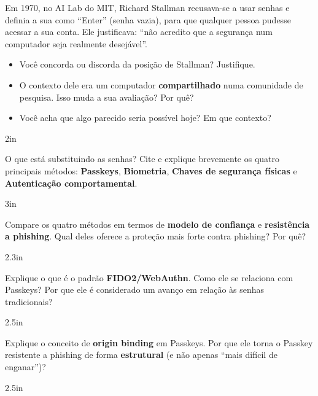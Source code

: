 \documentclass[12pt]{exam}
\begin{document}
	\noindent
\begin{questions}


\question Em 1970, no AI Lab do MIT, Richard Stallman recusava-se a usar senhas 
e definia a sua como ``Enter'' (senha vazia), para que qualquer pessoa pudesse 
acessar a sua conta. Ele justificava: ``não acredito que a segurança num 
computador seja realmente desejável''.

\begin{itemize}
\item Você concorda ou discorda da posição de Stallman? Justifique.
\item O contexto dele era um computador \textbf{compartilhado} numa comunidade 
de pesquisa. Isso muda a sua avaliação? Por quê?
\item Você acha que algo parecido seria possível hoje? Em que contexto?
\end{itemize}
\begin{solutionbox}{2in}
\end{solutionbox}


\question O que está substituindo as senhas? Cite e explique brevemente 
os quatro principais métodos: \textbf{Passkeys}, \textbf{Biometria}, 
\textbf{Chaves de segurança físicas} e \textbf{Autenticação comportamental}.
\begin{solutionbox}{3in}
\end{solutionbox}

\question Compare os quatro métodos em termos de \textbf{modelo de confiança} 
e \textbf{resistência a phishing}. Qual deles oferece a proteção mais forte 
contra phishing? Por quê?
\begin{solutionbox}{2.3in}
\end{solutionbox}

\question Explique o que é o padrão \textbf{FIDO2/WebAuthn}. Como ele se 
relaciona com Passkeys? Por que ele é considerado um avanço em relação às 
senhas tradicionais?
\begin{solutionbox}{2.5in}
\end{solutionbox}


\question Explique o conceito de \textbf{origin binding} em Passkeys. 
Por que ele torna o Passkey resistente a phishing de forma \textbf{estrutural} 
(e não apenas ``mais difícil de enganar'')?
\begin{solutionbox}{2.5in}
\end{solutionbox}


\end{questions}
\end{document}
